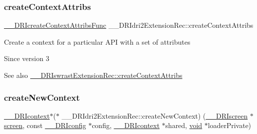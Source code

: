 \subsubsection{\texorpdfstring{create\+Context\+Attribs}{createContextAttribs}}
{\footnotesize\ttfamily \hyperlink{dri__interface_8h_a4f3d1005ed90cec052090fda5340fbfc}{\+\_\+\+\_\+\+D\+R\+Icreate\+Context\+Attribs\+Func} \+\_\+\+\_\+\+D\+R\+Idri2\+Extension\+Rec\+::create\+Context\+Attribs}

Create a context for a particular A\+PI with a set of attributes

\begin{DoxySince}{Since}
version 3
\end{DoxySince}
\begin{DoxySeeAlso}{See also}
\hyperlink{struct_____d_r_iswrast_extension_rec_a2432fdc12df7ee3feb1e31fa8efc8c71}{\+\_\+\+\_\+\+D\+R\+Iswrast\+Extension\+Rec\+::create\+Context\+Attribs} 
\end{DoxySeeAlso}
\mbox{\label{struct_____d_r_idri2_extension_rec_a887b9ee8dc23cd4b15daea66f0fd48fe}} 
\subsubsection{\texorpdfstring{create\+New\+Context}{createNewContext}}
{\footnotesize\ttfamily \hyperlink{dri__interface_8h_a3fd295cba82b5a3d79f1ee7e12bfb908}{\+\_\+\+\_\+\+D\+R\+Icontext}$\ast$($\ast$ \+\_\+\+\_\+\+D\+R\+Idri2\+Extension\+Rec\+::create\+New\+Context) (\hyperlink{dri__interface_8h_a9961b01d421ee1fd6ed3c05acc9ca561}{\+\_\+\+\_\+\+D\+R\+Iscreen} $\ast$\hyperlink{cad_8h_ae04e09e4e3831bfc1632c509ae37dcec}{screen}, const \hyperlink{dri__interface_8h_aeac81999efbbf8b1d6886338e3ea24d9}{\+\_\+\+\_\+\+D\+R\+Iconfig} $\ast$config, \hyperlink{dri__interface_8h_a3fd295cba82b5a3d79f1ee7e12bfb908}{\+\_\+\+\_\+\+D\+R\+Icontext} $\ast$shared, \hyperlink{_s_d_l__opengles2__gl2ext_8h_ae5d8fa23ad07c48bb609509eae494c95}{void} $\ast$loader\+Private)}

\mbox{\label{struct_____d_r_idri2_extension_rec_a804b05f07cd878f1eb495f4ec9902fea}} 
